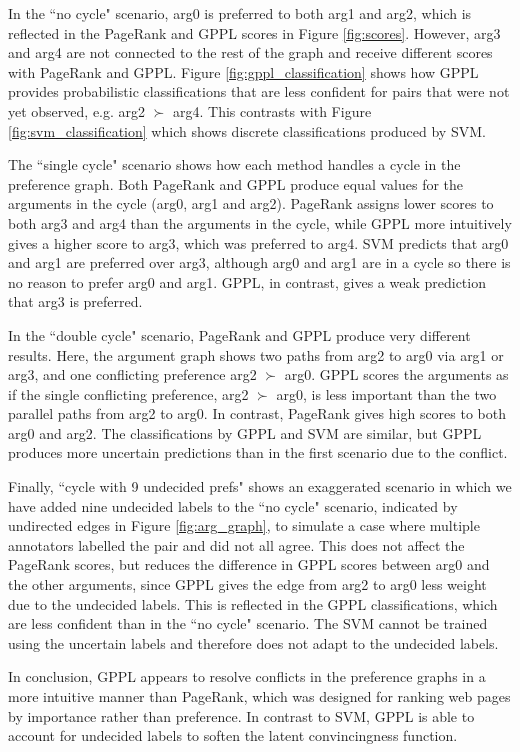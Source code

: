 In the  ``no cycle" scenario, 
arg0 is preferred to both arg1 and arg2, which is reflected in the PageRank and GPPL scores in Figure \ref{fig:scores}. However, arg3 and arg4 are not connected to the rest of the graph and receive different scores with PageRank and GPPL. 
Figure \ref{fig:gppl_classification} shows how GPPL provides probabilistic classifications that are less confident for pairs that were not yet observed, e.g. arg2 $\succ$ arg4. This contrasts with Figure \ref{fig:svm_classification} which shows discrete classifications produced by SVM.

The ``single cycle" scenario shows how each method handles a cycle in the preference graph.
Both PageRank and GPPL produce equal values for the arguments in the cycle (arg0, arg1 and arg2). PageRank assigns lower scores to both arg3 and arg4 than the arguments in the cycle, 
while GPPL more intuitively gives a higher score to arg3, which was preferred to arg4. 
SVM predicts that arg0 and arg1 are preferred over arg3, 
although arg0 and arg1 are in a cycle so there is no reason to prefer arg0 and arg1. 
GPPL, in contrast, gives a weak prediction that arg3 is preferred.

In the ``double cycle" scenario, PageRank and GPPL produce very different results.
Here, the argument graph shows two paths from arg2 to arg0 via arg1 or arg3, and one conflicting
preference arg2 $\succ$ arg0. 
GPPL scores the arguments as if the single conflicting preference, arg2 $\succ$ arg0, 
is less important than the two parallel paths from arg2 to arg0. 
In contrast, PageRank gives high scores to both arg0 and arg2.
The classifications by GPPL and SVM are similar, but GPPL produces more uncertain 
predictions than in the first scenario due to the conflict.

Finally, ``cycle with 9 undecided prefs" shows an exaggerated scenario in which
we have added nine undecided labels to the ``no cycle" scenario, indicated by 
undirected edges in Figure \ref{fig:arg_graph}, to simulate a case where multiple annotators labelled the pair 
and did not all agree. 
This does not affect the PageRank scores, 
but reduces the difference in GPPL scores between arg0 and the other arguments, 
since GPPL gives the edge from arg2 to arg0 less weight due to the undecided labels. 
This is reflected in the GPPL classifications, which are less confident than in the ``no cycle" scenario.
The SVM cannot be trained using the uncertain labels and therefore does not adapt to the undecided labels. 

In conclusion, GPPL appears to resolve conflicts in the preference graphs in a
more intuitive manner than PageRank, which was designed for ranking web pages by 
importance rather than preference. 
In contrast to SVM, GPPL is able to account for undecided labels to soften the latent convincingness function.

